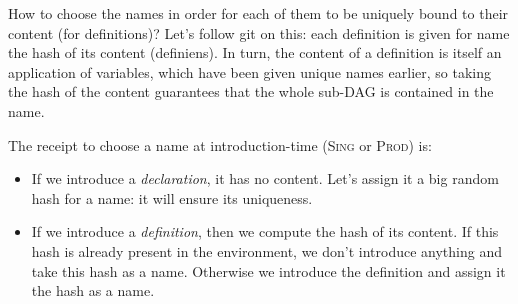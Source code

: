 \documentclass[12pt]{article}
\begin{document}
How to choose the names in order for each of them to be uniquely bound
to their content (for definitions)? Let's follow \textsf{git} on this:
each definition is given for name the hash of its content
(definiens). In turn, the content of a definition is itself an
application of variables, which have been given unique names earlier,
so taking the hash of the content guarantees that the whole sub-DAG is
contained in the name.

The receipt to choose a name at introduction-time (\textsc{Sing} or
\textsc{Prod}) is:
\begin{itemize}
\item If we introduce a \emph{declaration}, it has no content. Let's
  assign it a big random hash for a name: it will ensure its
  uniqueness.
\item If we introduce a \emph{definition}, then we compute the hash of
  its content. If this hash is already present in the environment, we
  don't introduce anything and take this hash as a name. Otherwise we
  introduce the definition and assign it the hash as a name.
\end{itemize}
\end{document}
